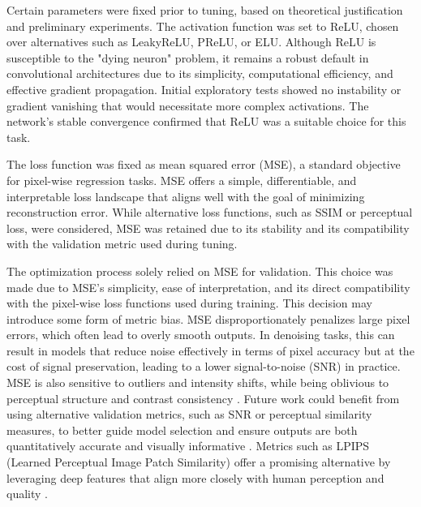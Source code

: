 \documentclass[twocolumn]{article}
\begin{document}
Certain parameters were fixed prior to tuning, based on theoretical justification and preliminary experiments. 
The activation function was set to ReLU, chosen over alternatives such as LeakyReLU, PReLU, or ELU. 
Although ReLU is susceptible to the "dying neuron" problem, it remains a robust default in convolutional architectures due to its simplicity, computational efficiency, and effective gradient propagation. 
Initial exploratory tests showed no instability or gradient vanishing that would necessitate more complex activations. 
The network’s stable convergence confirmed that ReLU was a suitable choice for this task.

The loss function was fixed as mean squared error (MSE), a standard objective for pixel-wise regression tasks. 
MSE offers a simple, differentiable, and interpretable loss landscape that aligns well with the goal of minimizing reconstruction error. 
While alternative loss functions, such as SSIM or perceptual loss, were considered, MSE was retained due to its stability and its compatibility with the validation metric used during tuning. 

The optimization process solely relied on MSE for validation. 
This choice was made due to MSE’s simplicity, ease of interpretation, and its direct compatibility with the pixel-wise loss functions used during training.  
This decision may introduce some form of metric bias. 
MSE disproportionately penalizes large pixel errors, which often lead to overly smooth outputs. 
In denoising tasks, this can result in models that reduce noise effectively in terms of pixel accuracy but at the cost of signal preservation, leading to a lower signal-to-noise (SNR) in practice. 
MSE is also sensitive to outliers and intensity shifts, while being oblivious to perceptual structure and contrast consistency \cite{1284395}. 
Future work could benefit from using alternative validation metrics, such as SNR or perceptual similarity measures, to better guide model selection and ensure outputs are both quantitatively accurate and visually informative \cite{chavhan2009t2star}. 
Metrics such as LPIPS (Learned Perceptual Image Patch Similarity) offer a promising alternative by leveraging deep features that align more closely with human perception and quality \cite{zhang2018unreasonableeffectivenessdeepfeatures}.
\end{document}
